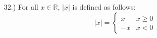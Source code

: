 \documentclass[12pt]{article}
\begin{document}
\begin{itemize}


    \item [32.)] For all $x\in\mathbb{R}$, $\vert x\vert$ is defined as follows:
    \[\vert x\vert=
        \begin{cases}
            x&x\geq0\\
            -x&x<0
        \end{cases}
    \]





\end{itemize}
\end{document}

